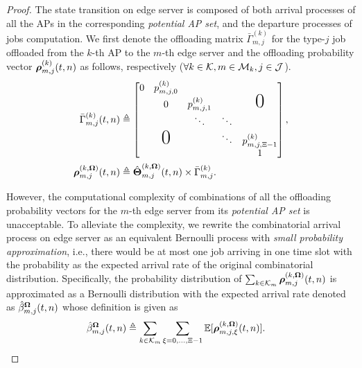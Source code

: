 \begin{proof}
    The state transition on edge server is composed of both arrival processes of all the APs in the corresponding \emph{potential AP set}, and the departure processes of jobs computation.
    We first denote the offloading matrix $\bar{\Gamma}^{(k)}_{m,j}$ for the type-$j$ job offloaded from the $k$-th AP to the $m$-th edge server and the offloading probability vector $\boldsymbol{\rho}^{(k)}_{m,j}({t,n})$ as follows, respectively ($\forall k\in\mathcal{K}, m\in\mathcal{M}_{k}, j\in\mathcal{J}$).
    \begin{align}
        \bar{\Gamma}^{(k)}_{m,j}(t,n) &\define
        \begin{bmatrix}
            0 & p^{(k)}_{m,j,0} &                 &        &                     \\
            & 0                 & p^{(k)}_{m,j,1} &        & \text{\huge0}       \\
            &                   & \ddots          & \ddots &                     \\
            & \text{\huge0}     &                 & \ddots & p^{(k)}_{m,j,\Xi-1} \\
            &                   &                 &        & 1                   \\
        \end{bmatrix},
        \\
        \vecG{\rho}^{(k, \Policy)}_{m,j}({t,n}) &\define \hat{\vecG{\Theta}}^{(k, \Policy)}_{m,j}({t,n}) \times \bar{\Gamma}^{(k)}_{m,j}.
    \end{align}

    However, the computational complexity of combinations of all the offloading probability vectors for the $m$-th edge server from its \emph{potential AP set} is unacceptable.
    To alleviate the complexity, we rewrite the combinatorial arrival process on edge server as an equivalent Bernoulli process with \emph{small probability approximation}, i.e., there would be at most one job arriving in one time slot with the probability as the expected arrival rate of the original combinatorial distribution.
    Specifically, the probability distribution of $\sum_{k\in\mathcal{K}_{m}} \boldsymbol{\rho}^{(k, \boldsymbol{\Omega})}_{m,j}({t,n})$ is approximated as a Bernoulli distribution with the expected arrival rate denoted as $\hat{\beta}^{\boldsymbol{\Omega}}_{m,j}({t,n})$ whose definition is given as
    \begin{align}
        \hat{\beta}^{\boldsymbol{\Omega}}_{m,j}({t,n}) &\triangleq \sum_{k\in\mathcal{K}_{m}} \sum_{\xi=0,\dots,\Xi-1} \mathbb{E}[\boldsymbol{\rho}^{(k, \boldsymbol{\Omega})}_{m,j,\xi}({t,n})].
    \end{align}


\end{proof}
